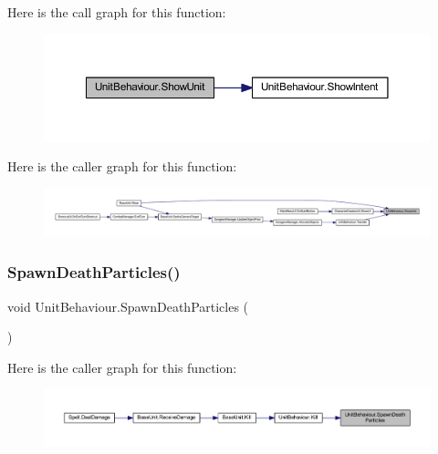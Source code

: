 Here is the call graph for this function\+:
\nopagebreak
\begin{figure}[H]
\begin{center}
\leavevmode
\includegraphics[width=350pt]{class_unit_behaviour_a41b8d7f5a98e21449eafe21a31707b1d_cgraph}
\end{center}
\end{figure}
Here is the caller graph for this function\+:
\nopagebreak
\begin{figure}[H]
\begin{center}
\leavevmode
\includegraphics[width=350pt]{class_unit_behaviour_a41b8d7f5a98e21449eafe21a31707b1d_icgraph}
\end{center}
\end{figure}
\mbox{\label{class_unit_behaviour_a17b46e508ee650f487d4bf79608da4eb}} 
\subsubsection{\texorpdfstring{SpawnDeathParticles()}{SpawnDeathParticles()}}
{\footnotesize\ttfamily void Unit\+Behaviour.\+Spawn\+Death\+Particles (\begin{DoxyParamCaption}{ }\end{DoxyParamCaption})}

Here is the caller graph for this function\+:
\nopagebreak
\begin{figure}[H]
\begin{center}
\leavevmode
\includegraphics[width=350pt]{class_unit_behaviour_a17b46e508ee650f487d4bf79608da4eb_icgraph}
\end{center}
\end{figure}
\mbox{\label{class_unit_behaviour_a558929aaa9173e1a3b9dfecd8674660f}} 
